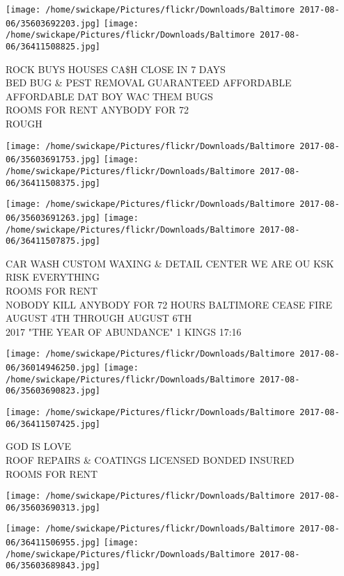 \documentclass[10pt,letterpaper]{article}
\begin{document}
\texttt{[image: /home/swickape/Pictures/flickr/Downloads/Baltimore 2017-08-06/35603692203.jpg]}
\texttt{[image: /home/swickape/Pictures/flickr/Downloads/Baltimore 2017-08-06/36411508825.jpg]}

ROCK BUYS HOUSES CA\$H CLOSE IN 7 DAYS\\
BED BUG \& PEST REMOVAL GUARANTEED AFFORDABLE AFFORDABLE DAT BOY WAC THEM BUGS\\
ROOMS FOR RENT ANYBODY FOR 72\\
ROUGH
\pagebreak

\texttt{[image: /home/swickape/Pictures/flickr/Downloads/Baltimore 2017-08-06/35603691753.jpg]}
\texttt{[image: /home/swickape/Pictures/flickr/Downloads/Baltimore 2017-08-06/36411508375.jpg]}

\texttt{[image: /home/swickape/Pictures/flickr/Downloads/Baltimore 2017-08-06/35603691263.jpg]}
\texttt{[image: /home/swickape/Pictures/flickr/Downloads/Baltimore 2017-08-06/36411507875.jpg]}

CAR WASH CUSTOM WAXING \& DETAIL CENTER WE ARE OU KSK RISK EVERYTHING\\
ROOMS FOR RENT\\
NOBODY KILL ANYBODY FOR 72 HOURS BALTIMORE CEASE FIRE AUGUST 4TH THROUGH AUGUST 6TH\\
2017 "THE YEAR OF ABUNDANCE" 1 KINGS 17:16
\pagebreak

\texttt{[image: /home/swickape/Pictures/flickr/Downloads/Baltimore 2017-08-06/36014946250.jpg]}
\texttt{[image: /home/swickape/Pictures/flickr/Downloads/Baltimore 2017-08-06/35603690823.jpg]}

\texttt{[image: /home/swickape/Pictures/flickr/Downloads/Baltimore 2017-08-06/36411507425.jpg]}

GOD IS LOVE\\
ROOF REPAIRS \& COATINGS LICENSED BONDED INSURED\\
ROOMS FOR RENT
\pagebreak

\texttt{[image: /home/swickape/Pictures/flickr/Downloads/Baltimore 2017-08-06/35603690313.jpg]}

\vspace{0.25in}
\texttt{[image: /home/swickape/Pictures/flickr/Downloads/Baltimore 2017-08-06/36411506955.jpg]}
\texttt{[image: /home/swickape/Pictures/flickr/Downloads/Baltimore 2017-08-06/35603689843.jpg]}
\end{document}
